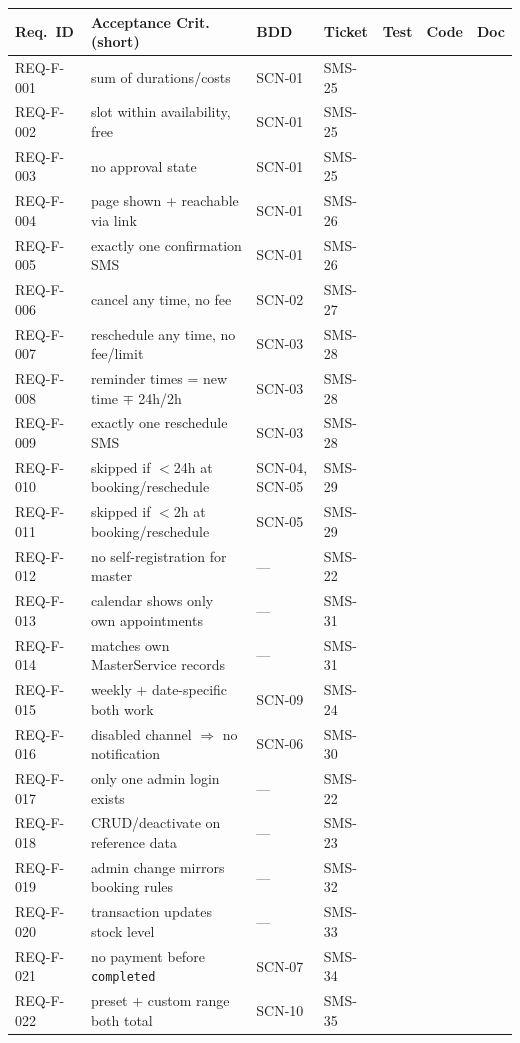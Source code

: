 \documentclass[11pt,a4paper]{article}
\begin{document}
\begin{longtable}{L{1.7cm}L{2.3cm}L{1.6cm}L{1.4cm}L{1.4cm}L{1.4cm}L{1.4cm}}
\toprule
Req.\ ID & Acceptance Crit. (short) & BDD & Ticket & Test & Code & Doc \\
\midrule
\endhead
REQ-F-001 & sum of durations/costs & SCN-01 & SMS-25 & & & \\
REQ-F-002 & slot within availability, free & SCN-01 & SMS-25 & & & \\
REQ-F-003 & no approval state & SCN-01 & SMS-25 & & & \\
REQ-F-004 & page shown + reachable via link & SCN-01 & SMS-26 & & & \\
REQ-F-005 & exactly one confirmation SMS & SCN-01 & SMS-26 & & & \\
REQ-F-006 & cancel any time, no fee & SCN-02 & SMS-27 & & & \\
REQ-F-007 & reschedule any time, no fee/limit & SCN-03 & SMS-28 & & & \\
REQ-F-008 & reminder times = new time $\mp$ 24h/2h & SCN-03 & SMS-28 & & & \\
REQ-F-009 & exactly one reschedule SMS & SCN-03 & SMS-28 & & & \\
REQ-F-010 & skipped if $<$24h at booking/reschedule & SCN-04, SCN-05 & SMS-29 & & & \\
REQ-F-011 & skipped if $<$2h at booking/reschedule & SCN-05 & SMS-29 & & & \\
REQ-F-012 & no self-registration for master & --- & SMS-22 & & & \\
REQ-F-013 & calendar shows only own appointments & --- & SMS-31 & & & \\
REQ-F-014 & matches own MasterService records & --- & SMS-31 & & & \\
REQ-F-015 & weekly + date-specific both work & SCN-09 & SMS-24 & & & \\
REQ-F-016 & disabled channel $\Rightarrow$ no notification & SCN-06 & SMS-30 & & & \\
REQ-F-017 & only one admin login exists & --- & SMS-22 & & & \\
REQ-F-018 & CRUD/deactivate on reference data & --- & SMS-23 & & & \\
REQ-F-019 & admin change mirrors booking rules & --- & SMS-32 & & & \\
REQ-F-020 & transaction updates stock level & --- & SMS-33 & & & \\
REQ-F-021 & no payment before \texttt{completed} & SCN-07 & SMS-34 & & & \\
REQ-F-022 & preset + custom range both total & SCN-10 & SMS-35 & & & \\

\end{longtable}
\end{document}
